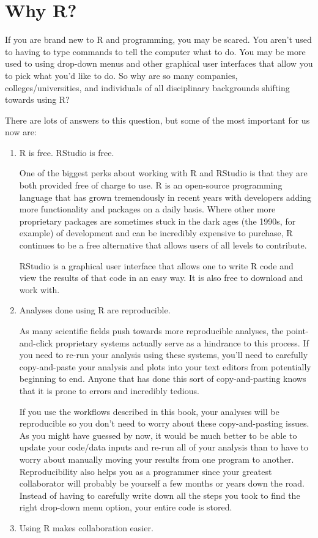 \documentclass[]{tufte-book}
\begin{document}
\chapter{Why R?}\label{whyR}

If you are brand new to R and programming, you may be scared. You aren't
used to having to type commands to tell the computer what to do. You may
be more used to using drop-down menus and other graphical user
interfaces that allow you to pick what you'd like to do. So why are so
many companies, colleges/universities, and individuals of all
disciplinary backgrounds shifting towards using R?

There are lots of answers to this question, but some of the most
important for us now are:

\begin{enumerate}
\def\labelenumi{\arabic{enumi}.}
\item
  R is free. RStudio is free.

  One of the biggest perks about working with R and RStudio is that they
  are both provided free of charge to use. R is an open-source
  programming language that has grown tremendously in recent years with
  developers adding more functionality and packages on a daily basis.
  Where other more proprietary packages are sometimes stuck in the dark
  ages (the 1990s, for example) of development and can be incredibly
  expensive to purchase, R continues to be a free alternative that
  allows users of all levels to contribute.

  RStudio is a graphical user interface that allows one to write R code
  and view the results of that code in an easy way. It is also free to
  download and work with.
\item
  Analyses done using R are reproducible.

  As many scientific fields push towards more reproducible analyses, the
  point-and-click proprietary systems actually serve as a hindrance to
  this process. If you need to re-run your analysis using these systems,
  you'll need to carefully copy-and-paste your analysis and plots into
  your text editors from potentially beginning to end. Anyone that has
  done this sort of copy-and-pasting knows that it is prone to errors
  and incredibly tedious.

  If you use the workflows described in this book, your analyses will be
  reproducible so you don't need to worry about these copy-and-pasting
  issues. As you might have guessed by now, it would be much better to
  be able to update your code/data inputs and re-run all of your
  analysis than to have to worry about manually moving your results from
  one program to another. Reproducibility also helps you as a programmer
  since your greatest collaborator will probably be yourself a few
  months or years down the road. Instead of having to carefully write
  down all the steps you took to find the right drop-down menu option,
  your entire code is stored.
\item
  Using R makes collaboration easier.


\end{enumerate}
\end{document}
